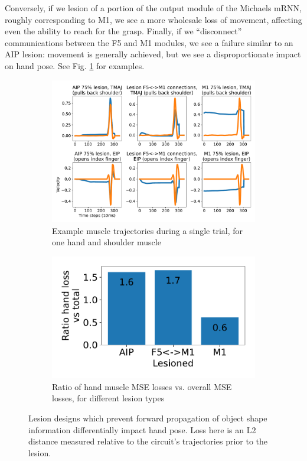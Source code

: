 \documentclass[12pt]{iopart}
\begin{document}
Conversely, if we lesion of a portion of the output module of the Michaels mRNN, roughly
corresponding to M1, we see a more wholesale loss of movement, affecting even the
ability to reach for the grasp. Finally, if we ``disconnect'' communications between the
F5 and M1 modules, we see a failure similar to an AIP lesion: movement is generally
achieved, but we see a disproportionate impact on hand pose.
See Fig. \ref{fig:lesion} for examples.

\begin{figure}[h]
	\centering
	\begin{subfigure}[c]{0.62\textwidth}
	    \centering
	    \includegraphics[width=\textwidth]{lesion_trajs.pdf}
	    \caption{Example muscle trajectories during a single trial, for one hand and shoulder muscle}
	\end{subfigure}
	\hfill
	\begin{subfigure}[c]{0.32\textwidth}
	    \centering
	    \includegraphics[width=\textwidth]{lesion_hand.pdf}
	    \caption{Ratio of hand muscle MSE losses vs. overall MSE losses, for different lesion types}
	\end{subfigure}
	\hfill
	\caption{Lesion designs which prevent forward propagation of object shape information
	         differentially impact hand pose. Loss here is an L2 distance
		 measured relative to the circuit's trajectories prior to the lesion.}
	\label{fig:lesion}
\end{figure}
\end{document}
